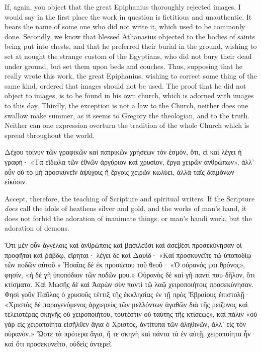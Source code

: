 \documentclass[10pt]{book}
\newcommand{\switchGreek}[1][]{\selectlanguage{polutonikogreek} \switchcolumn*[#1]}
\newcommand{\switchEnglish}{\selectlanguage{english} \switchcolumn}
\begin{document}
\begin{paracol}{2}
If, again, you object that the great Epiphanius thoroughly rejected images, I would say 
in the first place the work in question is fictitious and unauthentic. It bears the name of 
some one who did not write it, which used to 
be commonly done. Secondly, we know that 
blessed Athanasius objected to the bodies of 
saints being put into chests, and that he 
preferred their burial in the ground, wishing 
to set at nought the strange custom of the 
Egyptians, who did not bury their dead under 
ground, but set them upon beds and couches. 
Thus, supposing that he really wrote this work, 
the great Epiphanius, wishing to correct some 
thing of the same kind, ordered that images 
should not be used. The proof that he did 
not object to images, is to be found in his 
own church, which is adorned with images 
to this day. Thirdly, the exception is not a 
law to the Church, neither does one swallow 
make summer, as it seems to Gregory the 
theologian, and to the truth. Neither can one 
expression overturn the tradition of the whole 
Church which is spread throughout the world. 

\switchGreek

Δέχου τοίνυν τῶν γραφικῶν καὶ πατρικῶν χρήσεων τὸν ἑσμόν, ὅτι, εἰ καὶ λέγει ἡ γραφή· «Τὰ εἴδωλα τῶν ἐθνῶν ἀργύριον καὶ χρυσίον, ἔργα χειρῶν ἀνθρώπων», ἀλλ’ οὖν οὐ τὸ μὴ προσκυνεῖν ἀψύχοις ἢ ἔργοις χειρῶν κωλύει, ἀλλὰ ταῖς δαιμόνων εἰκόσιν.

\switchEnglish

Accept, therefore, the teaching of Scripture 
and spiritual writers. If the Scripture \emph{does} call 
the idols of heathens silver and gold, and the 
works of man's hand, it does not forbid the 
adoration of inanimate things, or man's handi 
work, but the adoration of demons. 

\switchGreek

Ὅτι μὲν οὖν ἀγγέλοις καὶ ἀνθρώποις καὶ βασιλεῦσι καὶ ἀσεβέσι προσεκύνησαν οἱ προφῆται καὶ ῥάβδῳ, εἴρηται· λέγει δὲ καὶ Δαυίδ· «Καὶ προσκυνεῖτε τῷ ὑποποδίῳ τῶν ποδῶν αὐτοῦ.»
Ἡσαΐας δὲ ἐκ προσώπου τοῦ θεοῦ· «Ὁ οὐρανός μοι θρόνος», φησίν, «ἡ δὲ γῆ ὑποπόδιον τῶν ποδῶν μου.»
Οὐρανὸς δὲ καὶ γῆ παντί που δῆλον, ὅτι κτίσματα.
Καὶ Μωσῆς δὲ καὶ Ἀαρὼν σὺν παντὶ τῷ λαῷ χειροποιήτοις προσεκύνησαν.
Φησὶ γοῦν Παῦλος ὁ χρυσοῦς τέττιξ τῆς ἐκκλησίας ἐν τῇ πρὸς Ἑβραίους ἐπιστολῇ·
«Χριστὸς δὲ παραγενόμενος ἀρχιερεὺς τῶν μελλόντων ἀγαθῶν διὰ τῆς μείζονος καὶ
τελειοτέρας σκηνῆς οὐ χειροποιήτου, τουτέστιν οὐ ταύτης τῆς κτίσεως», καὶ
πάλιν «οὐ γὰρ εἰς χειροποίητα εἰσῆλθεν ἅγια ὁ Χριστός, ἀντίτυπα τῶν ἀληθινῶν,
ἀλλ’ εἰς τὸν οὐρανόν.»
Ὥστε τὰ πρότερα ἅγια, ἥ τε σκηνὴ καὶ πάντα τὰ ἐν αὐτῇ, χειροποίητα ἦν· καὶ ὅτι προσεκυνεῖτο, οὐδεὶς ἀντερεῖ.


\end{paracol}
\end{document}
